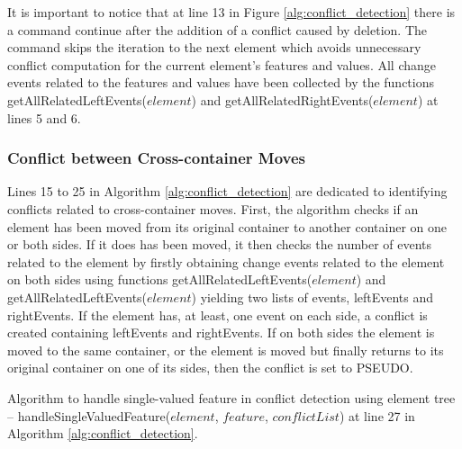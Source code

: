 It is important to notice that at line 13 in Figure \ref{alg:conflict_detection} there is a command \textsf{continue} after the addition of a conflict caused by deletion. The command skips the iteration to the next element which avoids unnecessary conflict computation for the current element's  features and values. All change events related to the features and values have been collected by the functions \textsf{getAllRelatedLeftEvents($element$)} and \textsf{getAllRelatedRightEvents($element$)} at lines 5 and 6.  

\subsubsection{Conflict between Cross-container Moves} 
\label{sec:move_conflict} 
Lines 15 to 25 in Algorithm \ref{alg:conflict_detection} are dedicated to identifying conflicts related to cross-container moves. 
First, the algorithm checks if an element has been moved from its original container to another container on one or both sides. 
If it does has been moved, 
it then checks the number of events related to the element by firstly obtaining change events related to the element on 
both sides using functions \textsf{getAllRelatedLeftEvents($element$)} and \textsf{getAllRelatedLeftEvents($element$)} yielding two lists of events, 
\textsf{leftEvents} and \textsf{rightEvents}. If the element has, at least, one event on each side,
a conflict is created containing \textsf{leftEvents} and \textsf{rightEvents}. 
If on both sides the element is moved to the same container, or the element is moved but finally returns to its original container on one of its sides, then the conflict is set to \textsf{PSEUDO}.

\IncMargin{1.5em}
\begin{algorithm*}[]
\caption{Algorithm to handle single-valued feature in conflict detection using element tree -- handleSingleValuedFeature($element$, $feature$, $conflictList$) at line 27 in Algorithm \ref{alg:conflict_detection}.}
\label{alg:conflict_single_valued_feature}
\end{algorithm*}
\DecMargin{1.5em}

